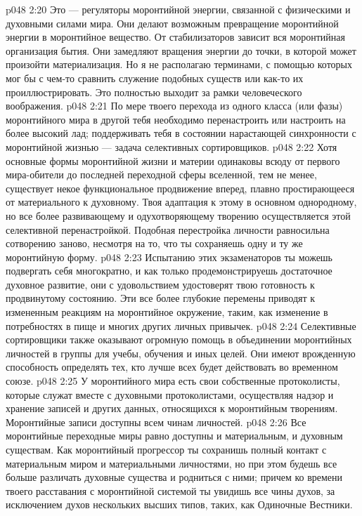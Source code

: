 \vs p048 2:20 \pc {}\bibnobreakspace {} Это --- регуляторы моронтийной энергии, связанной с физическими и духовными силами мира. Они делают возможным превращение моронтийной энергии в моронтийное вещество. От стабилизаторов зависит вся моронтийная организация бытия. Они замедляют вращения энергии до точки, в которой может произойти материализация. Но я не располагаю терминами, с помощью которых мог бы с чем\hyp{}то сравнить служение подобных существ или как\hyp{}то их проиллюстрировать. Это полностью выходит за рамки человеческого воображения.
\vs p048 2:21 \pc {}\bibnobreakspace {} По мере твоего перехода из одного класса (или фазы) моронтийного мира в другой тебя необходимо перенастроить или настроить на более высокий лад; поддерживать тебя в состоянии нарастающей синхронности с моронтийной жизнью --- задача селективных сортировщиков.
\vs p048 2:22 Хотя основные формы моронтийной жизни и материи одинаковы всюду от первого мира\hyp{}обители до последней переходной сферы вселенной, тем не менее, существует некое функциональное продвижение вперед, плавно простирающееся от материального к духовному. Твоя адаптация к этому в основном однородному, но все более развивающему и одухотворяющему творению осуществляется этой селективной перенастройкой. Подобная перестройка личности равносильна сотворению заново, несмотря на то, что ты сохраняешь одну и ту же моронтийную форму.
\vs p048 2:23 Испытанию этих экзаменаторов ты можешь подвергать себя многократно, и как только продемонстрируешь достаточное духовное развитие, они с удовольствием удостоверят твою готовность к продвинутому состоянию. Эти все более глубокие перемены приводят к измененным реакциям на моронтийное окружение, таким, как изменение в потребностях в пище и многих других личных привычек.
\vs p048 2:24 Селективные сортировщики также оказывают огромную помощь в объединении моронтийных личностей в группы для учебы, обучения и иных целей. Они имеют врожденную способность определять тех, кто лучше всех будет действовать во временном союзе.
\vs p048 2:25 \pc {}\bibnobreakspace {} У моронтийного мира есть свои собственные протоколисты, которые служат вместе с духовными протоколистами, осуществляя надзор и хранение записей и других данных, относящихся к моронтийным творениям. Моронтийные записи доступны всем чинам личностей.
\vs p048 2:26 Все моронтийные переходные миры равно доступны и материальным, и духовным существам. Как моронтийный прогрессор ты сохранишь полный контакт с материальным миром и материальными личностями, но при этом будешь все больше различать духовные существа и родниться с ними; причем ко времени твоего расставания с моронтийной системой ты увидишь все чины духов, за исключением духов нескольких высших типов, таких, как Одиночные Вестники.
